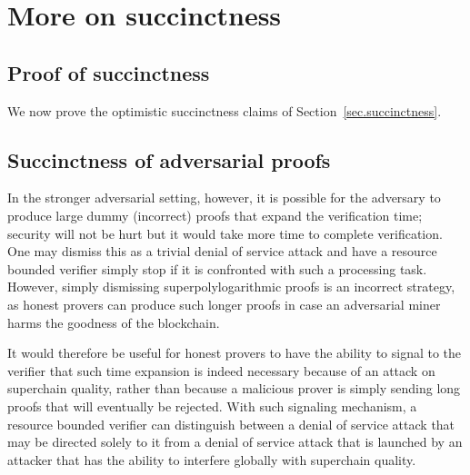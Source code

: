 \section{More on succinctness}
\label{sec.app-succinctness}

\subsection{Proof of succinctness}
We now prove the optimistic succinctness claims of
Section~\ref{sec.succinctness}.





\subsection{Succinctness of adversarial proofs}
In the stronger adversarial setting, however, it is possible for the adversary
to produce large dummy (incorrect) proofs that expand the verification time;
security will not be hurt but it would take more time to complete verification.
One may dismiss this as a trivial denial of service attack and have a resource
bounded verifier simply stop if it is confronted with such a processing task.
However, simply dismissing superpolylogarithmic proofs is an incorrect strategy,
as honest provers can produce such longer proofs in case an adversarial miner
harms the goodness of the blockchain.

It would therefore be useful for honest provers to have the ability to
signal to the verifier that such time expansion is indeed necessary because of
an attack on superchain quality, rather than because a malicious prover is
simply sending long proofs that will eventually be rejected. With such signaling
mechanism, a resource bounded verifier can distinguish between a denial of
service attack that may be directed solely to it from  a denial of service
attack that  is launched by an attacker that has the ability to  interfere
globally with superchain quality.

